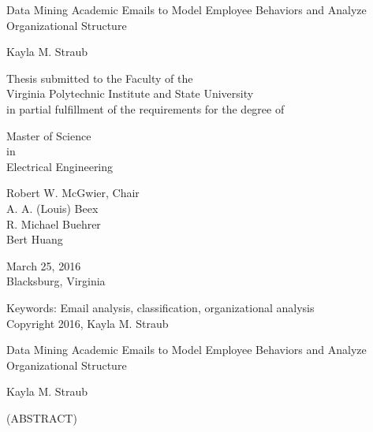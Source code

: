 \documentclass[12pt]{report}
\begin{document}
\thispagestyle{empty}
\begin{center}

{\Large 
Data Mining Academic Emails to Model Employee Behaviors and Analyze Organizational Structure
}

\vfill

Kayla M. Straub

\vfill

Thesis submitted to the Faculty of the \\
Virginia Polytechnic Institute and State University \\
in partial fulfillment of the requirements for the degree of

\vfill

Master of Science \\
in \\
Electrical Engineering
\vfill

Robert W. McGwier, Chair \\
A. A. (Louis) Beex\\
R. Michael Buehrer\\
Bert Huang

\vfill

March 25, 2016 \\
Blacksburg, Virginia

\vfill

Keywords: Email analysis, classification, organizational analysis
\\
Copyright 2016, Kayla M. Straub

\end{center}

\pagebreak

\thispagestyle{empty}
\begin{center}

{\large Data Mining Academic Emails to Model Employee Behaviors and Analyze Organizational Structure}

\vfill

Kayla M. Straub

\vfill

(ABSTRACT)

\vfill

\end{center}
\end{document}
